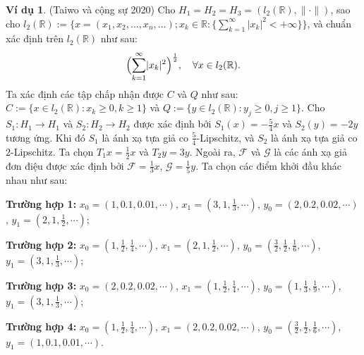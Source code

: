 \documentclass[11pt,a4paper]{article}
\theoremstyle{plain}
\theoremstyle{definition}
\newtheorem{example}[theorem]{Ví dụ}
\theoremstyle{remark}
\numberwithin{equation}{section}
\newcommand{\Fc}{\mathcal{F}}
\newcommand{\Gc}{\mathcal{G}}
\newcommand{\nm}[1]{\lVert #1\rVert}
\newcommand{\abs}[1]{\lvert #1\rvert}
\newcommand{\R}{\mathbb{R}}
\begin{document}
\begin{example}\label{ex:5.2}
(Taiwo và cộng sự 2020) Cho $H_1=H_2=H_3=(l_2(\R),\nm{\cdot})$, sao cho $l_2(\R):=\{x=(x_1,x_2,\ldots,x_n,\ldots);x_k\in\R:\{\sum_{k=1}^{\infty}\abs{x_k}^2<+\infty\}\}$, và chuẩn xác định trên $l_2(\R)$ như sau:
\[
\Bigl(\sum_{k=1}^{\infty}\abs{x_k}^2\Bigr)^{\frac{1}{2}},\quad\forall x\in l_2(\R).
\]
Ta xác định các tập chấp nhận được $C$ và $Q$ như sau: $C:=\{x\in l_2(\R):x_k\ge 0,k\ge 1\}$ và $Q:=\{y\in l_2(\R):y_j\ge 0,j\ge 1\}$. Cho $S_1:H_1\to H_1$ và $S_2:H_2\to H_2$ được xác định bởi $S_1(x)=-\tfrac{5}{4}x$ và $S_2(y)=-2y$ tương ứng. Khi đó $S_1$ là ánh xạ tựa giả co $\tfrac{5}{4}$-Lipschitz, và $S_2$ là ánh xạ tựa giả co $2$-Lipschitz. Ta chọn $T_1x=\tfrac{1}{2}x$ và $T_2y=3y$. Ngoài ra, $\Fc$ và $\Gc$ là các ánh xạ giả đơn điệu được xác định bởi $\Fc=\tfrac{1}{3}x$, $\Gc=\tfrac{1}{5}y$. Ta chọn các điểm khởi đầu khác nhau như sau:

\noindent\textbf{Trường hợp 1:} $x_0=(1,0.1,0.01,\cdots)$, $x_1=(3,1,\tfrac{1}{3},\cdots)$, $y_0=(2,0.2,0.02,\cdots)$, $y_1=(2,1,\tfrac{1}{2},\cdots)$;

\noindent\textbf{Trường hợp 2:} $x_0=(1,\tfrac{1}{2},\tfrac{1}{4},\cdots)$, $x_1=(2,1,\tfrac{1}{2},\cdots)$, $y_0=(\tfrac{3}{2},\tfrac{1}{2},\tfrac{1}{6},\cdots)$, $y_1=(3,1,\tfrac{1}{3},\cdots)$;

\noindent\textbf{Trường hợp 3:} $x_0=(2,0.2,0.02,\cdots)$, $x_1=(1,\tfrac{1}{2},\tfrac{1}{4},\cdots)$, $y_0=(1,\tfrac{1}{3},\tfrac{1}{9},\cdots)$, $y_1=(3,1,\tfrac{1}{3},\cdots)$;

\noindent\textbf{Trường hợp 4:} $x_0=(1,\tfrac{1}{2},\tfrac{1}{4},\cdots)$, $x_1=(2,0.2,0.02,\cdots)$, $y_0=(\tfrac{3}{2},\tfrac{1}{2},\tfrac{1}{6},\cdots)$, $y_1=(1,0.1,0.01,\cdots)$.
\end{example}
\end{document}
